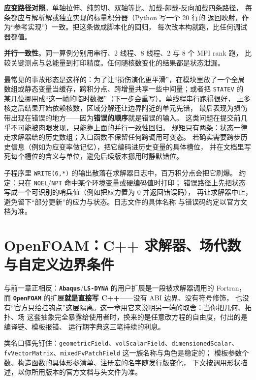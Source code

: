 \documentclass[12pt,a4paper,fontset=fandol]{ctexbook}
\newcommand{\Tp}[1]{\texttt{#1}}
\newcommand{\Bk}{\discretionary{}{}{}}
\newcommand{\Lib}[1]{\textbf{\texttt{#1}}}
\newcommand{\Lang}[1]{\textsf{#1}}
\newcommand{\CPP}{\Lang{C++}}
\newcommand{\PY}{\Lang{Python}}
\begin{document}
\textbf{应变路径对照}。单轴拉伸、纯剪切、双轴等比、加载-卸载-反向加载四条路径，
每条都应与解析解或独立实现的标量积分器（\PY{} 写一个 20 行的
返回映射，作为``参考实现''）一致。把这条做成脚本化的回归，
每次改本构就跑，比任何调试器都值。

\textbf{并行一致性}。同一算例分别用串行、2 线程、8 线程、2 与 8 个 MPI rank 跑，
比较关键测点与总能量到打印精度。任何随核数变化的结果都是状态泄漏。

\begin{warning}[title={把历史变量当缓存用，结果随核数变化}]
最常见的事故形态是这样的：为了让``损伤演化更平滑''，在模块里放了一个全局
数组或静态变量当缓存，跨积分点、跨增量共享一些中间量；或者把 \Tp{STATEV} 的
某几位挪用成``这一帧的临时数据''（下一步会重写）。单线程串行跑得很好，
上多核之后结果开始依赖核数，区域分解还让边界附近的单元先错，
最后表现为损伤带出现在错误的地方——因为\textbf{错误的顺序}就是错误的输入。
这类问题在提交前几乎不可能被肉眼发现，只能靠上面的并行一致性回归。
规矩只有两条：状态一律走求解器给的历史数组；入口函数不保留任何跨调用可变态。
若确实需要跨步历史信息（例如为应变率做记忆），把它编码进历史变量的具体槽位，
并在文档里写死每个槽位的含义与单位，避免后续版本挪用时静默错位。
\end{warning}

\begin{note}[title={作业失败时先看第一条错误而不是最后一条}]
子程序里 \Tp{WRITE(6,*)} 的输出散落在求解器日志中，百万积分点会把它刷爆。
约定：只在 \Tp{NOEL}/{\Bk}\Tp{NPT} 命中某个环境变量或硬编码值时打印；
错误路径上先把状态写成一个可识别的哨兵值（例如把应力置为 0 并返回错误码），
再让求解器中止，避免留下``部分更新''的应力与状态。日志文件的具体名称
与错误码约定以官方文档为准。
\end{note}

\chapter{OpenFOAM：C++ 求解器、场代数与自定义边界条件}
\label{ch:ch06-openfoam}

与前一章正相反：\Lib{Abaqus}/{\Bk}\Lib{LS-DYNA} 的用户扩展是一段被求解器调用的 Fortran，
而 \Lib{OpenFOAM} 的扩展\textbf{就是直接写 \CPP{}}——没有 ABI 边界、没有符号修饰，
也没有``官方只给挂钩点''这层隔离。这一章用它来说明另一端的取舍：当你把几何、拓扑、场
这套抽象完全暴露给使用者时，换来的是任意改方程的自由度，付出的是编译链、模板报错、
运行期字典这三笔持续的利息。

类名口径先钉住：\Tp{geometric{\Bk}Field}、\Tp{vol{\Bk}Scalar{\Bk}Field}、\Tp{dimensioned{\Bk}Scalar}、
\Tp{fv{\Bk}Vector{\Bk}Matrix}、\Tp{mixed{\Bk}Fv{\Bk}Patch{\Bk}Field} 这一族名称与角色是稳定的；
模板参数个数、构造函数的具体形参清单、注册宏的名字随发行版变化，
下文按调用形状描述，以你所用版本的官方文档与头文件为准。
\end{document}
